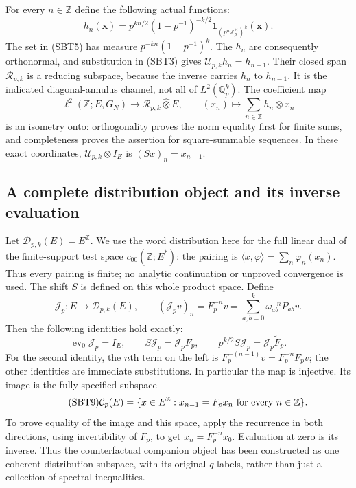 \documentclass[11pt]{article}
\begin{document}
For every $n\in\mathbb Z$ define the following actual functions:
\begin{equation}\tag{SBT5}
 h_n(\mathbf x)=p^{kn/2}(1-p^{-1})^{-k/2}
       \mathbf1_{(p^n\mathbb Z_p^\times)^k}(\mathbf x).
\end{equation}
The set in (SBT5) has measure $p^{-kn}(1-p^{-1})^k$.
The $h_n$ are consequently orthonormal, and substitution in (SBT3)
gives $\mathscr U_{p,k}h_n=h_{n+1}$. Their closed span $\mathcal R_{p,k}$
is a reducing subspace, because the inverse carries $h_n$ to $h_{n-1}$.
It is the indicated diagonal-annulus channel, not all of
$L^2(\mathbb Q_p^k)$. The coefficient map
\begin{equation}\tag{SBT6}
 \ell^2(\mathbb Z;E,G_N)\longrightarrow
       \mathcal R_{p,k}\widehat\otimes E,\qquad
 (x_n)\longmapsto\sum_{n\in\mathbb Z}h_n\otimes x_n
\end{equation}
is an isometry onto: orthogonality proves the norm equality first for
finite sums, and completeness proves the assertion for square-summable
sequences. In these exact coordinates, $\mathscr U_{p,k}\otimes I_E$
is $(Sx)_n=x_{n-1}$.

\subsection{A complete distribution object and its inverse evaluation}

Let $\mathcal D_{p,k}(E)=E^{\mathbb Z}$. We use the word distribution
here for the full linear dual of the finite-support test space
$c_{00}(\mathbb Z;E^*)$: the pairing is
$\langle x,\varphi\rangle=\sum_n\varphi_n(x_n)$. Thus every pairing
is finite; no analytic continuation or unproved convergence is used.
The shift $S$ is defined on this whole product space.
Define
\begin{equation}\tag{SBT7}
 \mathcal J_p:E\longrightarrow\mathcal D_{p,k}(E),\qquad
 (\mathcal J_pv)_n=F_p^{-n}v
  =\sum_{a,b=0}^k\omega_{ab}^{-n}P_{ab}v .
\end{equation}
Then the following identities hold exactly:
\begin{equation}\tag{SBT8}
 \operatorname{ev}_0\mathcal J_p=I_E,\qquad
 S\mathcal J_p=\mathcal J_pF_p,\qquad
 p^{k/2}S\mathcal J_p=\mathcal J_p\widetilde F_p .
\end{equation}
For the second identity, the $n$th term on the left is
$F_p^{-(n-1)}v=F_p^{-n}F_pv$; the other identities are immediate
substitutions. In particular the map is injective. Its image is the
fully specified subspace
\begin{equation}\tag{SBT9}
 \mathcal C_p(E)=
 \{x\in E^{\mathbb Z}:x_{n-1}=F_px_n\ \hbox{for every }n\in\mathbb Z\}.
\end{equation}
To prove equality of the image and this space, apply the recurrence
in both directions, using invertibility of $F_p$, to get
$x_n=F_p^{-n}x_0$. Evaluation at zero is its inverse. Thus the
counterfactual companion object has been constructed as one coherent
distribution subspace, with its original $q$ labels, rather than just
a collection of spectral inequalities.
\end{document}

